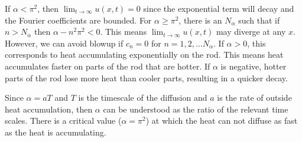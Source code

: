\documentclass[paper=a4, fontsize=11pt]{scrartcl} %
\theoremstyle{plain}
\numberwithin{equation}{section} %
\numberwithin{figure}{section} %
\numberwithin{table}{section} %
\begin{document}
\begin{enumerate}[\bf (a)]
        If $\alpha < \pi^2$, then $\lim_{t\rightarrow\infty}u(x,t) = 0$ since the exponential term will decay and the Fourier coefficients are bounded.  For $\alpha \geq \pi^2$, there is an $N_\alpha$ such that if $n > N_\alpha$ then $\alpha - n^2 \pi^2 < 0$.  This means $\lim_{t\rightarrow\infty}u(x,t)$ may diverge at any $x$.  However, we can avoid blowup if $c_n = 0$ for $n = 1, 2, \dots N_\alpha$.  If $\alpha > 0$, this corresponds to heat accumulating exponentially on the rod.  This means heat accumulates faster on parts of the rod that are hotter.  If $\alpha$ is negative, hotter parts of the rod lose more heat than cooler parts, resulting in a quicker decay.

        Since $\alpha = aT$ and $T$ is the timescale of the diffusion and $a$ is the rate of outside heat accumulation, then $\alpha$ can be understood as the ratio of the relevant time scales.  There is a critical value ($\alpha = \pi^2$) at which the heat can not diffuse as fast as the heat is accumulating.
\end{enumerate}
\end{document}
